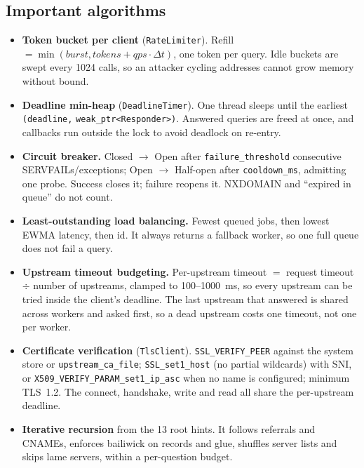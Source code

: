 \documentclass[11pt,a4paper]{article}
\newcommand{\code}[1]{\texttt{#1}}
\begin{document}
\subsection{Important algorithms}
\begin{itemize}
  \item \textbf{Token bucket per client} (\code{RateLimiter}). Refill $= \min(\textit{burst},
  \textit{tokens} + \textit{qps}\cdot\Delta t)$, one token per query. Idle buckets are swept every 1024 calls,
  so an attacker cycling addresses cannot grow memory without bound.
  \item \textbf{Deadline min-heap} (\code{DeadlineTimer}). One thread sleeps until the earliest
  \code{(deadline,} \code{weak\_ptr<Responder>)}. Answered queries are freed at once, and callbacks run outside the
  lock to avoid deadlock on re-entry.
  \item \textbf{Circuit breaker.} Closed $\rightarrow$ Open after \code{failure\_threshold} consecutive
  SERVFAILs/exceptions; Open $\rightarrow$ Half-open after \code{cooldown\_ms}, admitting one probe. Success
  closes it; failure reopens it. NXDOMAIN and ``expired in queue'' do not count.
  \item \textbf{Least-outstanding load balancing.} Fewest queued jobs, then lowest EWMA latency, then id. It
  always returns a fallback worker, so one full queue does not fail a query.
  \item \textbf{Upstream timeout budgeting.} Per-upstream timeout $=$ request timeout $\div$ number of upstreams,
  clamped to 100--1000~ms, so every upstream can be tried inside the client's deadline. The last upstream that
  answered is shared across workers and asked first, so a dead upstream costs one timeout, not one per worker.
  \item \textbf{Certificate verification} (\code{TlsClient}). \code{SSL\_VERIFY\_PEER} against the system store or
  \code{upstream\_ca\_file}; \code{SSL\_set1\_host} (no partial wildcards) with SNI, or
  \code{X509\_VERIFY\_\allowbreak PARAM\_\allowbreak set1\_ip\_asc} when no name is configured; minimum TLS~1.2. The connect, handshake,
  write and read all share the per-upstream deadline.
  \item \textbf{Iterative recursion} from the 13 root hints. It follows referrals and CNAMEs, enforces bailiwick
  on records and glue, shuffles server lists and skips lame servers, within a per-question budget.
\end{itemize}
\end{document}
